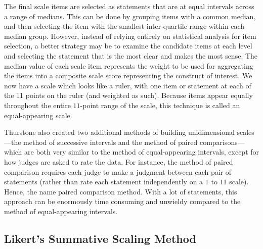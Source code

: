 The final scale items are selected as statements that are at equal intervals across a range of medians. This can be done by grouping items with a common median, and then selecting the item with the smallest inter-quartile range within each median group. However, instead of relying entirely on statistical analysis for item selection, a better strategy may be to examine the candidate items at each level and selecting the statement that is the most clear and makes the most sense. The median value of each scale item represents the weight to be used for aggregating the items into a composite scale score representing the construct of interest. We now have a scale which looks like a ruler, with one item or statement at each of the 11 points on the ruler (and weighted as such). Because items appear equally throughout the entire $ 11 $-point range of the scale, this technique is called an equal-appearing scale.

Thurstone also created two additional methods of building unidimensional scales---the method of successive intervals and the method of paired comparisons---which are both very similar to the method of equal-appearing intervals, except for how judges are asked to rate the data. For instance, the method of paired comparison requires each judge to make a judgment between each pair of statements (rather than rate each statement independently on a $ 1 $ to $ 11 $ scale). Hence, the name paired comparison method. With a lot of statements, this approach can be enormously time consuming and unwieldy compared to the method of equal-appearing intervals.

\subsection{Likert's Summative Scaling Method}

